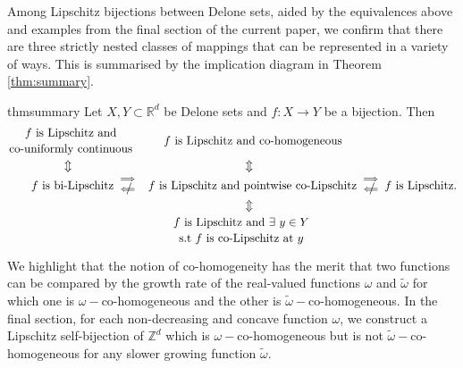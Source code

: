 \documentclass{article}
\newcommand{\R}{\mathbb{R}}
\newcommand{\Z}{\mathbb{Z}}
\begin{document}
Among Lipschitz bijections between Delone sets, aided by the equivalences above and examples from the final section of the current paper, we confirm that there are three strictly nested classes of mappings that can be represented in a variety of ways. This is summarised by the implication diagram in Theorem \ref{thm:summary}.
\begin{restatable}{thm}{summary} \label{thm:summary}
    Let $X,Y\subset \R^{d}$ be Delone sets and $f: X\to Y$ be a bijection. Then
\begin{equation} \label{eq: thm summary}
    \begin{split}
        &{\text{$f$ is Lipschitz and} \atop \text{co-uniformly continuous}} \qquad  \;\; \text{$f$ is Lipschitz and co-homogeneous} \\
        &  \;\;\qquad\qquad\Updownarrow \qquad\qquad\qquad\qquad \qquad \qquad\qquad \;\;\;\Updownarrow \\
&\qquad\text{$f$ is bi-Lipschitz}\;\;{\substack{\Longrightarrow\\ \mathrel{\rlap{\hskip .5em/}}\Longleftarrow}}\;\; \;\;\text{$f$ is Lipschitz and pointwise co-Lipschitz} \;\; {\substack{\Longrightarrow\\ \mathrel{\rlap{\hskip .5em/}}\Longleftarrow}} \;\;\text{$f$ is Lipschitz}.\\
    &\qquad\qquad\qquad \qquad\qquad\qquad\qquad\qquad \qquad \qquad\Updownarrow\\
    & \qquad\qquad\qquad \qquad \qquad \qquad \qquad{{\text{$f$ is Lipschitz and $\exists$ $y \in Y$} \atop \text{s.t $f$ is co-Lipschitz at $y$}}}
    \end{split}
\end{equation}
 \end{restatable}   

We highlight that the notion of co-homogeneity has the merit that two functions can be compared by the growth rate of the real-valued functions $\omega$ and $\tilde{\omega}$ for which one is $\omega-$co-homogeneous and the other is $\tilde{\omega}-$co-homogeneous. In the final section, for each non-decreasing and concave function $\omega$, we construct a Lipschitz self-bijection of $\Z^d$ which is $\omega-$co-homogeneous but is not $\tilde{\omega}-$co-homogeneous for any slower growing function $\tilde{\omega}$.
\end{document}
